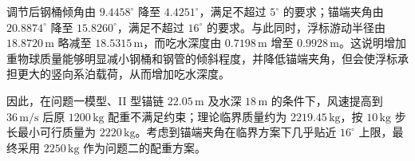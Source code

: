 调节后钢桶倾角由 $9.4458^{\circ}$ 降至 $4.4251^{\circ}$，满足不超过 $5^{\circ}$ 的要求；锚端夹角由 $20.8874^{\circ}$ 降至 $15.8260^{\circ}$，满足不超过 $16^{\circ}$ 的要求。与此同时，浮标游动半径由 $18.8720\,\mathrm{m}$ 略减至 $18.5315\,\mathrm{m}$，而吃水深度由 $0.7198\,\mathrm{m}$ 增至 $0.9928\,\mathrm{m}$。这说明增加重物球质量能够明显减小钢桶和钢管的倾斜程度，并降低锚端夹角，但会使浮标承担更大的竖向系泊载荷，从而增加吃水深度。

因此，在问题一模型、II 型锚链 $22.05\,\mathrm{m}$ 及水深 $18\,\mathrm{m}$ 的条件下，风速提高到 $36\,\mathrm{m/s}$ 后原 $1200\,\mathrm{kg}$ 配重不满足约束；理论临界质量约为 $2219.45\,\mathrm{kg}$，按 $10\,\mathrm{kg}$ 步长最小可行质量为 $2220\,\mathrm{kg}$。考虑到锚端夹角在临界方案下几乎贴近 $16^{\circ}$ 上限，最终采用 $2250\,\mathrm{kg}$ 作为问题二的配重方案。
